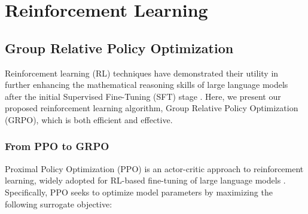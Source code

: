 \section{Reinforcement Learning}

\subsection{Group Relative Policy Optimization} Reinforcement learning (RL) techniques have demonstrated their utility in further enhancing the mathematical reasoning skills of large language models after the initial Supervised Fine-Tuning (SFT) stage \citep{wang2023math,wizardmath}. Here, we present our proposed reinforcement learning algorithm, Group Relative Policy Optimization (GRPO), which is both efficient and effective.

\subsubsection{From PPO to GRPO} Proximal Policy Optimization (PPO) \citep{schulman2017proximal} is an actor-critic approach to reinforcement learning, widely adopted for RL-based fine-tuning of large language models \citep{ouyang2022training}. Specifically, PPO seeks to optimize model parameters by maximizing the following surrogate objective:

